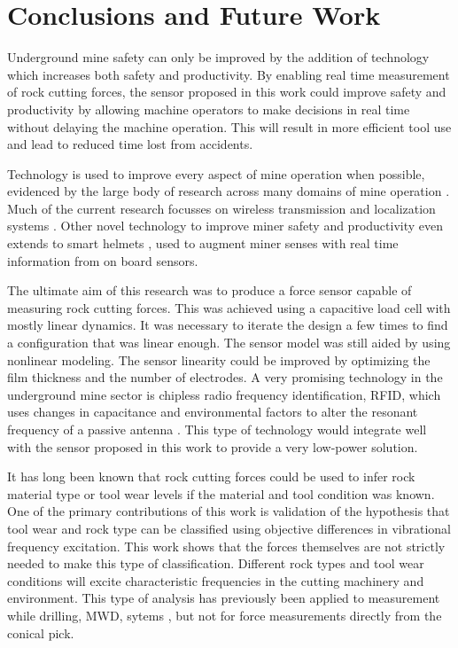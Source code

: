 \chapter{Conclusions and Future Work
\label{chap:11}}


Underground mine safety can only be improved by the addition of technology which increases both safety and 
productivity. By enabling real time measurement of rock cutting forces, the sensor proposed in this work
could improve safety and productivity by allowing machine operators to make decisions in real time without delaying
the machine operation. This will result in more efficient tool use and lead to reduced time lost from accidents.

Technology is used to improve every aspect of mine operation when possible, evidenced by the large body of 
research across many domains of mine operation \cite{LIU202412}.
Much of the current research focusses on wireless transmission and localization systems \cite{9536741, RayChowdhury2021}.
Other novel technology to improve miner safety and productivity even extends to smart helmets \cite{Sharma2018},
used to augment miner senses with real time information from on board sensors.

The ultimate aim of this research was to produce a force sensor capable of measuring rock cutting forces. 
This was achieved using a capacitive load cell with mostly linear dynamics. It was necessary to iterate the design
a few times to find a configuration that was linear enough. The sensor model was still aided by using nonlinear modeling.
The sensor linearity could be improved by optimizing the film thickness and the number of electrodes.
A very promising technology in the underground mine sector is chipless radio frequency identification, RFID, which uses changes
in capacitance and environmental factors to alter the resonant frequency of a passive antenna \cite{10081221}.
This type of technology would integrate well with the sensor proposed in this work to provide a very low-power solution.

It has long been known that rock cutting forces could be used to infer rock material type or tool wear levels 
if the material and tool condition was known. 
One of the primary contributions of this work is validation of the hypothesis that tool wear and rock type can be 
classified using objective differences in vibrational frequency excitation. 
This work shows that the forces themselves are not strictly needed to make this type of classification. 
Different rock types and tool wear conditions will excite characteristic frequencies in the cutting machinery and environment.
This type of analysis has previously been applied to measurement while drilling, MWD, sytems \cite{LIU202412}, 
but not for force measurements directly from the conical pick. 

